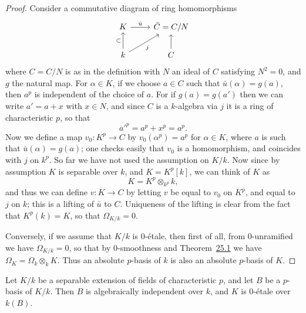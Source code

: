 \begin{proof}
Consider a commutative diagram of ring homomorphisms
\[
\begin{tikzcd}
K \arrow[r, "\bar{u}"] & \bar{C} = C/N \\
k \arrow[u, "\subset"] \arrow[ru, "j"'] & C \arrow[u]
\end{tikzcd}
\]
where $C = C/N$ is as in the definition with $N$ an ideal of $C$ satisfying $N^2 = 0$,
and $g$ the natural map. For $\alpha \in K$, if we choose $a \in C$ such that
$\bar{u}(\alpha) = g(a)$, then $a^p$ is independent of the choice of $a$. For if
$g(a) = g(a')$ then we can write $a' = a + x$ with $x \in N$, and since $C$ is a $k$-algebra
via $j$ it is a ring of characteristic $p$, so that
\[
  a'^p = a^p + x^p = a^p.
\]
Now we define a map $v_0\colon K^p \to C$ by $v_0(\alpha^p) = a^p$ for $\alpha \in K$, where $a$ is
such that $\bar{u}(\alpha) = g(a)$; one checks easily that $v_0$ is a homomorphism, and
coincides with $j$ on $k^p$. So far we have not used the assumption on $K/k$. Now
since by assumption $K$ is separable over $k$, and $K = K^p[k]$, we can think of $K$ as
\[
  K = K^p \otimes_{k^p} k,
\]
and thus we can define $v\colon K \to C$ by letting $v$ be equal to $v_0$ on $K^p$, and
equal to $j$ on $k$; this is a lifting of $\bar{u}$ to $C$. Uniqueness of the lifting is
clear from the fact that $K^p(k) = K$, so that $\Omega_{K/k} = 0$.

Conversely, if we assume that $K/k$ is 0-\'etale, then first of all, from
0-unramified we have $\Omega_{K/k} = 0$, so that by 0-smoothness and
Theorem~\hyperref[thm:25.1]{25.1} we have $\Omega_K = \Omega_k \otimes_k K$. Thus an absolute $p$-basis of $k$ is
also an absolute $p$-basis of $K$.
\end{proof}

\begin{theorem}\label{thm:26.8}
Let $K/k$ be a separable extension of fields of characteristic $p$, and let $B$ be a
$p$-basis of $K/k$. Then $B$ is algebraically independent over $k$, and $K$ is 0-\'etale
over $k(B)$.
\end{theorem}

